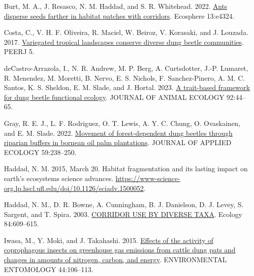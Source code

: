 \documentclass[
]{article}
\newlength{\cslhangindent}
\newlength{\cslentryspacingunit} %
\newenvironment{CSLReferences}[2] %
 {%
  \setlength{\parindent}{0pt}
  \ifodd #1
  \let\oldpar\par
  \def\par{\hangindent=\cslhangindent\oldpar}
  \fi
  \setlength{\parskip}{#2\cslentryspacingunit}
 }%
 {}
\begin{document}
\hypertarget{refs}{}
\begin{CSLReferences}{1}{0}
\leavevmode{}%
Burt, M. A., J. Resasco, N. M. Haddad, and S. R. Whitehead. 2022.
\href{https://doi.org/10.1002/ecs2.4324}{Ants disperse seeds farther in
habitat patches with corridors}. Ecosphere 13:e4324.

\leavevmode{}%
Costa, C., V. H. F. Oliveira, R. Maciel, W. Beiroz, V. Korasaki, and J.
Louzada. 2017. \href{https://doi.org/10.7717/peerj.3125}{Variegated
tropical landscapes conserve diverse dung beetle communities}. {PEERJ}
5.

\leavevmode{}%
deCastro-Arrazola, I., N. R. Andrew, M. P. Berg, A. Curtsdotter, J.-P.
Lumaret, R. Menendez, M. Moretti, B. Nervo, E. S. Nichols, F.
Sanchez-Pinero, A. M. C. Santos, K. S. Sheldon, E. M. Slade, and J.
Hortal. 2023. \href{https://doi.org/10.1111/1365-2656.13829}{A
trait-based framework for dung beetle functional ecology}. {JOURNAL}
{OF} {ANIMAL} {ECOLOGY} 92:44--65.

\leavevmode{}%
Gray, R. E. J., L. F. Rodriguez, O. T. Lewis, A. Y. C. Chung, O.
Ovaskainen, and E. M. Slade. 2022.
\href{https://doi.org/10.1111/1365-2664.14049}{Movement of
forest-dependent dung beetles through riparian buffers in bornean oil
palm plantations}. {JOURNAL} {OF} {APPLIED} {ECOLOGY} 59:238--250.

\leavevmode{}%
Haddad, N. M. 2015, March 20. Habitat fragmentation and its lasting
impact on earth's ecosystems {\textbar} science advances.
\url{https://www-science-org.lp.hscl.ufl.edu/doi/10.1126/sciadv.1500052}.

\leavevmode{}%
Haddad, N. M., D. R. Bowne, A. Cunningham, B. J. Danielson, D. J. Levey,
S. Sargent, and T. Spira. 2003.
\href{https://doi.org/10.1890/0012-9658(2003)084\%5B0609:CUBDT\%5D2.0.CO;2}{{CORRIDOR}
{USE} {BY} {DIVERSE} {TAXA}}. Ecology 84:609--615.

\leavevmode{}%
Iwasa, M., Y. Moki, and J. Takahashi. 2015.
\href{https://doi.org/10.1093/ee/nvu023}{Effects of the activity of
coprophagous insects on greenhouse gas emissions from cattle dung pats
and changes in amounts of nitrogen, carbon, and energy}. {ENVIRONMENTAL}
{ENTOMOLOGY} 44:106--113.


\end{CSLReferences}
\end{document}
